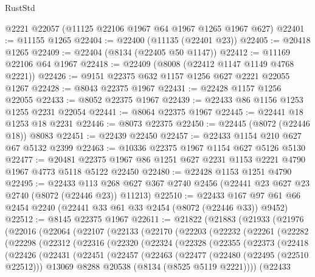 \begin{lexlean}{RustStd}
\begin{coremodule}
{\begin{coremodule}
{{{{{{{{{{{{{{{{{{{{{{{{{{{{{{{{{{{{{{{{{{{{{{{{{{{{{    @2221
    @22057
    (@11125 @22106 @1967 @64 @1967 @1265 @1967 @627)
@22401 := @11155 @1265
@22404 := @22400 (@11135 (@22401 @23))
@22405 := @20418 @1265
@22409 := @22404 (@8134 (@22405 @50 @1147))
@22412 := @11169 @22106 @64 @1967
@22418 := @22409 (@8008 (@22412 @1147 @1149 @4768 @2221))
@22426 := @9151 @22375 @632 @1157 @1256 @627 @2221 @22055 @1267
@22428 := @8043 @22375 @1967
@22431 := @22428 @1157 @1256 @22055
@22433 := @8052 @22375 @1967
@22439 := @22433 @86 @1156 @1253 @1255 @2231 @22054
@22441 := @8064 @22375 @1967
@22445 := @22441 @18 @1253 @18 @2231
@22446 := @8073 @22375
@22450 := @22445 (@8072 (@22446 @18)) @8083
@22451 := @22439 @22450
@22457 := @22433 @1154 @210 @627 @67 @5132 @2399
@22463 := @10336 @22375 @1967 @1154 @627 @5126 @5130
@22477 := @20481 @22375 @1967 @86 @1251 @627 @2231 @1153 @2221 @4790 @1967 @4773 @5118 @5122 @22450
@22480 := @22428 @1153 @1251 @4790
@22495 := @22433
    @113
    @268
    @627
    @367
    @2740
    @2456
    (@22441 @23 @627 @23 @2740 (@8072 (@22446 @23)) @11213)
@22510 := @22433 @167 @97 @61 @66 @2454 @2240 (@22441 @33 @61 @33 @2454 (@8072 (@22446 @33)) @9452)
@22512 := @8145 @22375 @1967
@22611 := @21822
    (@21883
      (@21933
        (@21976
          (@22016
            (@22064
              (@22107
                (@22133
                  (@22170
                    (@22203
                      (@22232
                        (@22261
                          (@22282
                            (@22298
                              (@22312
                                (@22316
                                  (@22320
                                    (@22324
                                      (@22328
                                        (@22355
                                          (@22373
                                            (@22418
                                              (@22426
                                                (@22431
                                                  (@22451
                                                    (@22457
                                                      (@22463
                                                        (@22477
                                                          (@22480 (@22495 (@22510 @22512)))
                                                          @13069
                                                          @8288
                                                          @20538
                                                          (@8134 (@8525 @5119 @2221))))
                                                      (@22433
}}}}}}}}}}}}}}}}}}}}}}}}}}}}}}}}}}}}}}}}}}}}}}}}}}}}}
\end{coremodule}}
\end{coremodule}
\end{lexlean}
